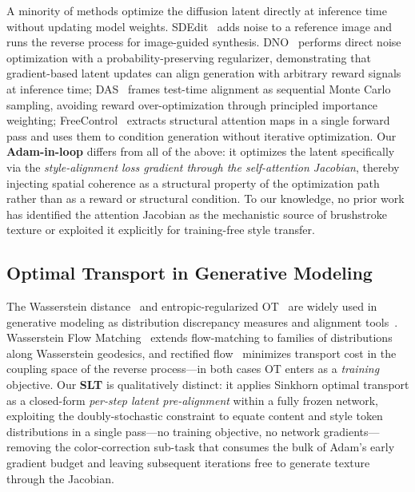 A minority of methods optimize the diffusion latent directly at inference
time without updating model weights.
SDEdit~\cite{meng2022sdedit} adds noise to a reference image and runs the
reverse process for image-guided synthesis.
DNO~\cite{dno2025} performs direct noise optimization with a
probability-preserving regularizer, demonstrating that gradient-based latent
updates can align generation with arbitrary reward signals at inference time;
DAS~\cite{das2025} frames test-time alignment as sequential Monte Carlo
sampling, avoiding reward over-optimization through principled importance
weighting; FreeControl~\cite{lin2025freecontrol} extracts structural attention
maps in a single forward pass and uses them to condition generation without
iterative optimization.
Our \textbf{Adam-in-loop} differs from all of the above: it optimizes the
latent specifically via the \emph{style-alignment loss gradient through the
self-attention Jacobian}, thereby injecting spatial coherence as a structural
property of the optimization path rather than as a reward or structural
condition.
To our knowledge, no prior work has identified the attention Jacobian as the
mechanistic source of brushstroke texture or exploited it explicitly for
training-free style transfer.

\subsection{Optimal Transport in Generative Modeling}

The Wasserstein distance~\cite{villani2009optimal} and entropic-regularized
OT~\cite{cuturi2013sinkhorn} are widely used in generative modeling as
distribution discrepancy measures and alignment
tools~\cite{peyre2019computational}.
Wasserstein Flow Matching~\cite{haviv2025wasserstein} extends flow-matching to
families of distributions along Wasserstein geodesics, and rectified
flow~\cite{esser2024scaling} minimizes transport cost in the coupling space of
the reverse process---in both cases OT enters as a \emph{training} objective.
Our \textbf{SLT} is qualitatively distinct: it applies Sinkhorn optimal
transport as a closed-form \emph{per-step latent pre-alignment} within a fully
frozen network, exploiting the doubly-stochastic constraint to equate content
and style token distributions in a single pass---no training objective, no
network gradients---removing the color-correction sub-task that consumes the
bulk of Adam's early gradient budget and leaving subsequent iterations free to
generate texture through the Jacobian.
